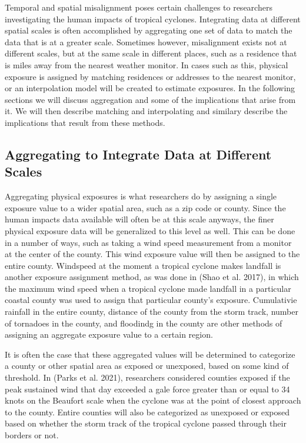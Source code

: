 \documentclass[
]{article}
\begin{document}
Temporal and spatial misalignment poses certain challenges to
researchers investigating the human impacts of tropical cyclones.
Integrating data at different spatial scales is often accomplished by
aggregating one set of data to match the data that is at a greater
scale. Sometimes however, misalignment exists not at different scales,
but at the same scale in different places, such as a residence that is
miles away from the nearest weather monitor. In cases such as this,
physical exposure is assigned by matching residences or addresses to the
nearest monitor, or an interpolation model will be created to estimate
exposures. In the following sections we will discuss aggregation and
some of the implications that arise from it. We will then describe
matching and interpolating and similary describe the implications that
result from these methods.

\hypertarget{aggregating-to-integrate-data-at-different-scales}{%
\subsection{Aggregating to Integrate Data at Different
Scales}\label{aggregating-to-integrate-data-at-different-scales}}

Aggregating physical exposures is what researchers do by assigning a
single exposure value to a wider spatial area, such as a zip code or
county. Since the human impacts data available will often be at this
scale anyways, the finer physical exposure data will be generalized to
this level as well. This can be done in a number of ways, such as taking
a wind speed measurement from a monitor at the center of the county.
This wind exposure value will then be assigned to the entire county.
Windspeed at the moment a tropical cyclone makes landfall is another
exposure assignment method, as was done in (Shao et al. 2017), in which
the maximum wind speed when a tropical cyclone made landfall in a
particular coastal county was used to assign that particular county's
exposure. Cumulativie rainfall in the entire county, distance of the
county from the storm track, number of tornadoes in the county, and
floodindg in the county are other methods of assigning an aggregate
exposure value to a certain region.

It is often the case that these aggregated values will be determined to
categorize a county or other spatial area as exposed or unexposed, based
on some kind of threshold. In (Parks et al. 2021), researchers
considered counties exposed if the peak sustained wind that day exceeded
a gale force greater than or equal to 34 knots on the Beaufort scale
when the cyclone was at the point of closest approach to the county.
Entire counties will also be categorized as unexposed or exposed based
on whether the storm track of the tropical cyclone passed through their
borders or not.
\end{document}
